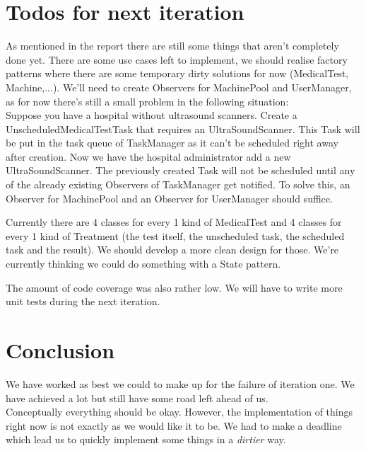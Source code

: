 \documentclass[11pt]{article}
\begin{document}
\section{Todos for next iteration}
As mentioned in the report there are still some things that aren't completely done yet. There are some use cases left to implement, we should realise factory patterns where there are some temporary dirty solutions for now (MedicalTest, Machine,...). We'll need to create Observers for MachinePool and UserManager, as for now there's still a small problem in the following situation:
\\Suppose you have a hospital without ultrasound scanners. Create a UnscheduledMedicalTestTask that requires an UltraSoundScanner. This Task will be put in the task queue of TaskManager as it can't be scheduled right away after creation. Now we have the hospital administrator add a new UltraSoundScanner. The previously created Task will not be scheduled until any of the already existing Observers of TaskManager get notified. To solve this, an Observer for MachinePool and an Observer for UserManager should suffice.

Currently there are 4 classes for every 1 kind of MedicalTest and 4 classes for every 1 kind of Treatment (the test itself, the unscheduled task, the scheduled task and the result). We should develop a more clean design for those. We're currently thinking we could do something with a State pattern.

The amount of code coverage was also rather low. We will have to write more unit tests during the next iteration.

\section{Conclusion}
We have worked as best we could to make up for the failure of iteration one. We have achieved a lot but still have some road left ahead of us. 
\\Conceptually everything should be okay. However, the implementation of things right now is not exactly as we would like it to be. We had to make a deadline which lead us to quickly implement some things in a \emph{dirtier} way.

\pagebreak
\end{document}
